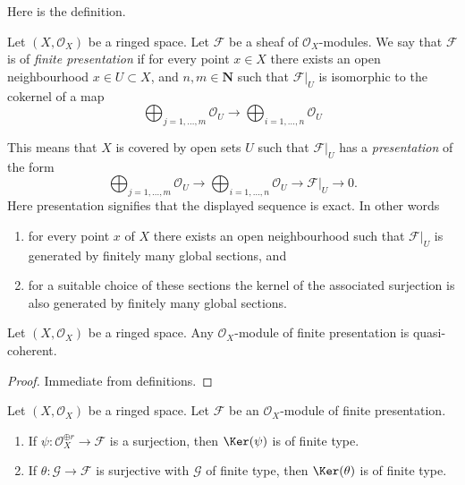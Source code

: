 \noindent
Here is the definition.

\begin{definition}
\label{definition-finite-presentation}
Let $(X, \mathcal{O}_X)$ be a ringed space.
Let $\mathcal{F}$ be a sheaf of $\mathcal{O}_X$-modules.
We say that $\mathcal{F}$ is of {\it finite presentation}
if for every point $x \in X$ there exists an open neighbourhood
$x\in U \subset X$, and  $n, m \in \mathbf{N}$ such that $\mathcal{F}|_U$
is isomorphic to the cokernel of a map
$$
\bigoplus\nolimits_{j = 1, \ldots, m}
\mathcal{O}_U
\longrightarrow
\bigoplus\nolimits_{i = 1, \ldots, n}
\mathcal{O}_U
$$
\end{definition}

\noindent
This means that $X$ is covered by open sets $U$
such that $\mathcal{F}|_U$ has a {\it presentation}
of the form
$$
\bigoplus\nolimits_{j = 1, \ldots, m}
\mathcal{O}_U
\longrightarrow
\bigoplus\nolimits_{i = 1, \ldots, n}
\mathcal{O}_U
\to
\mathcal{F}|_U
\to
0.
$$
Here presentation signifies that the displayed
sequence is exact. In other words
\begin{enumerate}
\item for every point $x$ of $X$ there exists
an open neighbourhood such that $\mathcal{F}|_U$
is generated by finitely many global sections, and
\item for a suitable choice of these sections
the kernel of the associated surjection is also
generated by finitely many global sections.
\end{enumerate}

\begin{lemma}
\label{lemma-finite-presentation-quasi-coherent}
Let $(X, \mathcal{O}_X)$ be a ringed space.
Any $\mathcal{O}_X$-module of finite presentation
is quasi-coherent.
\end{lemma}

\begin{proof}
Immediate from definitions.
\end{proof}

\begin{lemma}
\label{lemma-kernel-surjection-finite-free-onto-finite-presentation}
Let $(X, \mathcal{O}_X)$ be a ringed space.
Let $\mathcal{F}$ be an $\mathcal{O}_X$-module of finite presentation.
\begin{enumerate}
\item If $\psi : \mathcal{O}_X^{\oplus r} \to \mathcal{F}$ is a surjection,
then $\Ker(\psi)$ is of finite type.
\item If $\theta : \mathcal{G} \to \mathcal{F}$ is surjective with
$\mathcal{G}$ of finite type, then $\Ker(\theta)$ is of finite type.
\end{enumerate}
\end{lemma}

